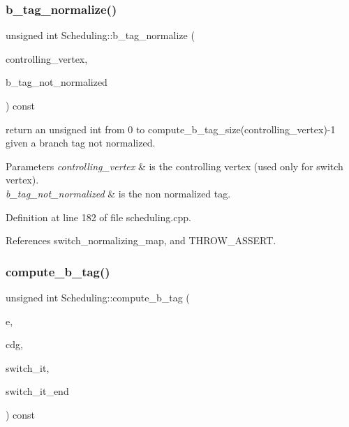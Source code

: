 \subsubsection{\texorpdfstring{b\+\_\+tag\+\_\+normalize()}{b\_tag\_normalize()}}
{\footnotesize\ttfamily unsigned int Scheduling\+::b\+\_\+tag\+\_\+normalize (\begin{DoxyParamCaption}\item[{\hyperlink{graph_8hpp_abefdcf0544e601805af44eca032cca14}{vertex}}]{controlling\+\_\+vertex,  }\item[{unsigned int}]{b\+\_\+tag\+\_\+not\+\_\+normalized }\end{DoxyParamCaption}) const\hspace{0.3cm}{\ttfamily [protected]}}



return an unsigned int from 0 to compute\+\_\+b\+\_\+tag\+\_\+size(controlling\+\_\+vertex)-\/1 given a branch tag not normalized. 


\begin{DoxyParams}{Parameters}
{\em controlling\+\_\+vertex} & is the controlling vertex (used only for switch vertex). \\
\hline
{\em b\+\_\+tag\+\_\+not\+\_\+normalized} & is the non normalized tag. \\
\hline
\end{DoxyParams}


Definition at line 182 of file scheduling.\+cpp.



References switch\+\_\+normalizing\+\_\+map, and T\+H\+R\+O\+W\+\_\+\+A\+S\+S\+E\+RT.

\mbox{\label{classScheduling_a9867cf2c93812bdbbd8e25fb02714c15}} 
\subsubsection{\texorpdfstring{compute\+\_\+b\+\_\+tag()}{compute\_b\_tag()}}
{\footnotesize\ttfamily unsigned int Scheduling\+::compute\+\_\+b\+\_\+tag (\begin{DoxyParamCaption}\item[{const \hyperlink{graph_8hpp_a9eb9afea34e09f484b21f2efd263dd48}{Edge\+Descriptor} \&}]{e,  }\item[{const \hyperlink{op__graph_8hpp_a9a0b240622c47584bee6951a6f5de746}{Op\+Graph\+Const\+Ref}}]{cdg,  }\item[{\hyperlink{classCustomOrderedSet}{Custom\+Ordered\+Set}$<$ unsigned int $>$\+::const\+\_\+iterator \&}]{switch\+\_\+it,  }\item[{\hyperlink{classCustomOrderedSet}{Custom\+Ordered\+Set}$<$ unsigned int $>$\+::const\+\_\+iterator \&}]{switch\+\_\+it\+\_\+end }\end{DoxyParamCaption}) const\hspace{0.3cm}{\ttfamily [protected]}}



